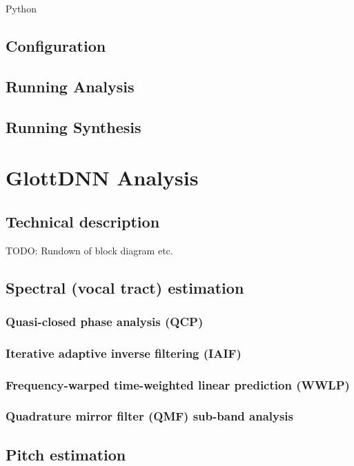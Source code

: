 \documentclass[a4paper, 11pt]{article}
\begin{document}
Python


\subsection{Configuration}

\subsection{Running Analysis}

\subsection{Running Synthesis}

\section{GlottDNN Analysis}

\subsection{Technical description}
TODO: Rundown of block diagram etc.

\subsection{Spectral (vocal tract) estimation}

\subsubsection{Quasi-closed phase analysis (QCP)}

\subsubsection{Iterative adaptive inverse filtering (IAIF)}

\subsubsection{Frequency-warped time-weighted linear prediction (WWLP)}

\subsubsection{Quadrature mirror filter (QMF) sub-band analysis}

\subsection{Pitch estimation}
\end{document}
